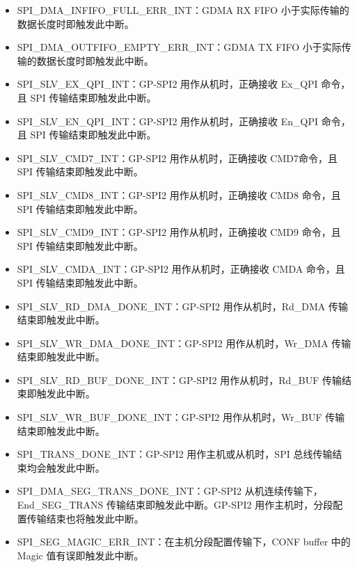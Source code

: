 \documentclass[main\_\_CN.tex]{subfiles}
\begin{document}
\begin{itemize}
\item \label{int:SPIINFIFOFULLERRINT}SPI\_DMA\_INFIFO\_FULL\_ERR\_INT：GDMA RX FIFO 小于实际传输的数据长度时即触发此中断。
\item \label{int:SPIOUTFIFOEMPTYERRINT}SPI\_DMA\_OUTFIFO\_EMPTY\_ERR\_INT：GDMA TX FIFO 小于实际传输的数据长度时即触发此中断。

\item \label{int:SPISLVEXQPIINT} SPI\_SLV\_EX\_QPI\_INT：GP-SPI2 用作从机时，正确接收 Ex\_QPI 命令，且 SPI 传输结束即触发此中断。
\item \label{int:SPISLVENQPIINT} SPI\_SLV\_EN\_QPI\_INT：GP-SPI2 用作从机时，正确接收 En\_QPI 命令，且 SPI 传输结束即触发此中断。
\item \label{int:SPISLVCMD7INT} SPI\_SLV\_CMD7\_INT：GP-SPI2 用作从机时，正确接收 CMD7命令，且 SPI 传输结束即触发此中断。
\item \label{int:SPISLVCMD8INT} SPI\_SLV\_CMD8\_INT：GP-SPI2 用作从机时，正确接收 CMD8 命令，且 SPI 传输结束即触发此中断。
\item \label{int:SPISLVCMD9INT} SPI\_SLV\_CMD9\_INT：GP-SPI2 用作从机时，正确接收 CMD9 命令，且 SPI 传输结束即触发此中断。
\item \label{int:SPISLVCMDAINT} SPI\_SLV\_CMDA\_INT：GP-SPI2 用作从机时，正确接收 CMDA 命令，且 SPI 传输结束即触发此中断。

\item \label{int:SPISLVRDDMADONEINT}SPI\_SLV\_RD\_DMA\_DONE\_INT：GP-SPI2 用作从机时，Rd\_DMA 传输结束即触发此中断。
\item \label{int:SPISLVWRDMADONEINT}SPI\_SLV\_WR\_DMA\_DONE\_INT：GP-SPI2 用作从机时，Wr\_DMA 传输结束即触发此中断。
\item \label{int:SPISLVRDBUFDONEINT}SPI\_SLV\_RD\_BUF\_DONE\_INT：GP-SPI2 用作从机时，Rd\_BUF 传输结束即触发此中断。
\item \label{int:SPISLVWRBUFDONEINT}SPI\_SLV\_WR\_BUF\_DONE\_INT：GP-SPI2 用作从机时，Wr\_BUF 传输结束即触发此中断。

\item \label{int:SPITRANSDONEINT}SPI\_TRANS\_DONE\_INT：GP-SPI2 用作主机或从机时，SPI 总线传输结束均会触发此中断。
\item \label{int:SPIDMASEGTRANSDONEINT}SPI\_DMA\_SEG\_TRANS\_DONE\_INT：GP-SPI2 从机连续传输下，End\_SEG\_TRANS 传输结束即触发此中断。GP-SPI2 用作主机时，分段配置传输结束也将触发此中断。
\item \label{int:SPISEGMAGICERRINT} SPI\_SEG\_MAGIC\_ERR\_INT：在主机分段配置传输下，CONF buffer 中的 Magic 值有误即触发此中断。


\end{itemize}
\end{document}

